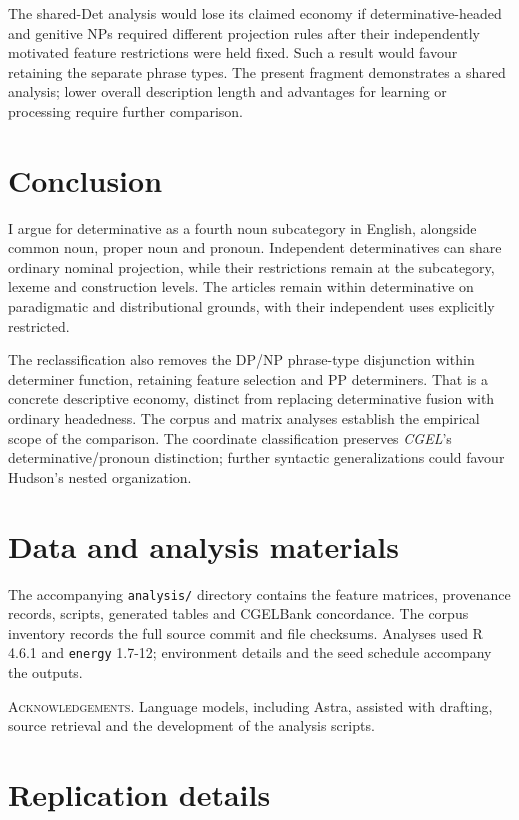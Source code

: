 \documentclass[12pt]{article}
\begin{document}
The shared-Det analysis would lose its claimed economy if determinative-headed and genitive NPs required different projection rules after their independently motivated feature restrictions were held fixed. Such a result would favour retaining the separate phrase types. The present fragment demonstrates a shared analysis; lower overall description length and advantages for learning or processing require further comparison.

\section{Conclusion}\label{sec:conclusion}

I argue for determinative as a fourth noun subcategory in English, alongside common noun, proper noun and pronoun. Independent determinatives can share ordinary nominal projection, while their restrictions remain at the subcategory, lexeme and construction levels. The articles remain within determinative on paradigmatic and distributional grounds, with their independent uses explicitly restricted.

The reclassification also removes the DP/NP phrase-type disjunction within determiner function, retaining feature selection and PP determiners. That is a concrete descriptive economy, distinct from replacing determinative fusion with ordinary headedness. The corpus and matrix analyses establish the empirical scope of the comparison. The coordinate classification preserves \textit{CGEL}'s determinative/pronoun distinction; further syntactic generalizations could favour Hudson's nested organization.

\section*{Data and analysis materials}

The accompanying \texttt{analysis/} directory contains the feature matrices, provenance records, scripts, generated tables and CGELBank concordance. The corpus inventory records the full source commit and file checksums. Analyses used R 4.6.1 and \texttt{energy} 1.7-12; environment details and the seed schedule accompany the outputs.

\vspace{0.5\baselineskip}
\noindent\textsc{Acknowledgements.} Language models, including Astra, assisted with drafting, source retrieval and the development of the analysis scripts.

\appendix
\section{Replication details}\label{app:replication}
\end{document}
